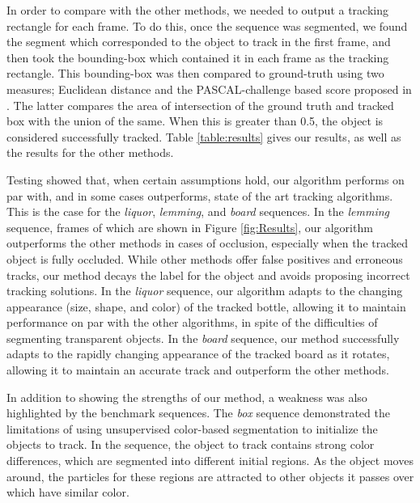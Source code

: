 In order to compare with the other methods, we needed to output a tracking rectangle for each frame. To do this, once the sequence was segmented, we found the segment which corresponded to the object to track in the first frame, and then took the bounding-box which contained it in each frame as the tracking rectangle. This bounding-box was then compared to ground-truth using two measures; Euclidean distance and the PASCAL-challenge based score proposed in \cite{PROST}. The latter compares the area of intersection of the ground truth and tracked box with the union of the same. When this is greater than 0.5, the object is considered successfully tracked. Table \ref{table:results} gives our results, as well as the results for the other methods.
 
 Testing showed that, when certain assumptions hold, our algorithm performs on par with, and in some cases outperforms, state of the art tracking algorithms. This is the case for the \textit{liquor}, \textit{lemming}, and \textit{board} sequences. In the \textit{lemming} sequence, frames of which are shown in Figure \ref{fig:Results}, our algorithm outperforms the other methods in cases of occlusion, especially when the tracked object is fully occluded. While other methods offer false positives and erroneous tracks, our method decays the label for the object and avoids proposing incorrect tracking solutions. In the \textit{liquor} sequence, our algorithm adapts to the changing appearance (size, shape, and color) of the tracked bottle, allowing it to maintain performance on par with the other algorithms, in spite of the difficulties of segmenting transparent objects. In the \textit{board} sequence, our method successfully adapts to the rapidly changing appearance of the tracked board as it rotates, allowing it to maintain an accurate track and outperform the other methods.

In addition to showing the strengths of our method, a weakness was also highlighted by the benchmark sequences. The \textit{box} sequence demonstrated the limitations of using unsupervised color-based segmentation to initialize the objects to track. In the sequence, the object to track contains strong color differences, which are segmented into different initial regions. As the object moves around, the particles for these regions are attracted to other objects it passes over which have similar color.  



